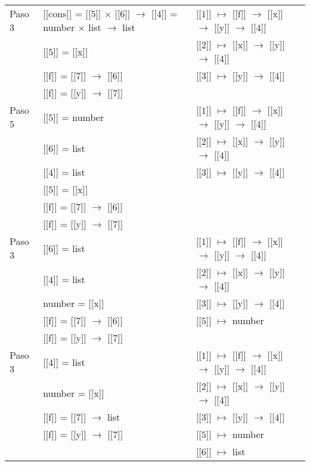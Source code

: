 \documentclass{article}
\begin{document}
\begin{center}
\begin{longtable}{ | l | p{10 cm} | p{5 cm} | }
 Paso 3  & [[cons]] = [[$\boxed{5}$]] $\times$ [[$\boxed{6}$]] $\rightarrow$ [[$\boxed{4}$]] 
	 = number $\times$ list $\rightarrow$ list 						& [[$\boxed{1}$]] $\mapsto$ [[f]] $\rightarrow$ [[x]] $\rightarrow$ [[y]] $\rightarrow$ [[$\boxed{4}$]] \\
	 & [[$\boxed{5}$]] = [[x]]  								& [[$\boxed{2}$]] $\mapsto$ [[x]] $\rightarrow$ [[y]] $\rightarrow$ [[$\boxed{4}$]] \\
	 & [[f]] = [[$\boxed{7}$]] $\rightarrow$ [[$\boxed{6}$]] 				& [[$\boxed{3}$]] $\mapsto$ [[y]] $\rightarrow$ [[$\boxed{4}$]] \\
	 & [[f]] = [[y]] $\rightarrow$ [[$\boxed{7}$]] 						& \\ \hline 
	 
 Paso 5  & [[$\boxed{5}$]] = number					& [[$\boxed{1}$]] $\mapsto$ [[f]] $\rightarrow$ [[x]] $\rightarrow$ [[y]] $\rightarrow$ [[$\boxed{4}$]] \\
	 & [[$\boxed{6}$]] = list					& [[$\boxed{2}$]] $\mapsto$ [[x]] $\rightarrow$ [[y]] $\rightarrow$ [[$\boxed{4}$]] \\
	 & [[$\boxed{4}$]] = list					& [[$\boxed{3}$]] $\mapsto$ [[y]] $\rightarrow$ [[$\boxed{4}$]] \\
	 & [[$\boxed{5}$]] = [[x]]  					& \\
	 & [[f]] = [[$\boxed{7}$]] $\rightarrow$ [[$\boxed{6}$]] 	& \\
	 & [[f]] = [[y]] $\rightarrow$ [[$\boxed{7}$]] 			& \\ \hline 
 
 Paso 3  & [[$\boxed{6}$]] = list					& [[$\boxed{1}$]] $\mapsto$ [[f]] $\rightarrow$ [[x]] $\rightarrow$ [[y]] $\rightarrow$ [[$\boxed{4}$]] \\
	 & [[$\boxed{4}$]] = list					& [[$\boxed{2}$]] $\mapsto$ [[x]] $\rightarrow$ [[y]] $\rightarrow$ [[$\boxed{4}$]] \\
	 & number = [[x]]  						& [[$\boxed{3}$]] $\mapsto$ [[y]] $\rightarrow$ [[$\boxed{4}$]] \\
	 & [[f]] = [[$\boxed{7}$]] $\rightarrow$ [[$\boxed{6}$]] 	& [[$\boxed{5}$]] $\mapsto$ number \\
	 & [[f]] = [[y]] $\rightarrow$ [[$\boxed{7}$]] 			& \\ \hline 
	 
 Paso 3  & [[$\boxed{4}$]] = list				& [[$\boxed{1}$]] $\mapsto$ [[f]] $\rightarrow$ [[x]] $\rightarrow$ [[y]] $\rightarrow$ [[$\boxed{4}$]] \\
	 & number = [[x]]  					& [[$\boxed{2}$]] $\mapsto$ [[x]] $\rightarrow$ [[y]] $\rightarrow$ [[$\boxed{4}$]] \\
	 & [[f]] = [[$\boxed{7}$]] $\rightarrow$ list		& [[$\boxed{3}$]] $\mapsto$ [[y]] $\rightarrow$ [[$\boxed{4}$]] \\
	 & [[f]] = [[y]] $\rightarrow$ [[$\boxed{7}$]] 		& [[$\boxed{5}$]] $\mapsto$ number \\ 
	 &	& [[$\boxed{6}$]] $\mapsto$ list \\ \hline
 

\end{longtable}
\end{center}
\end{document}

